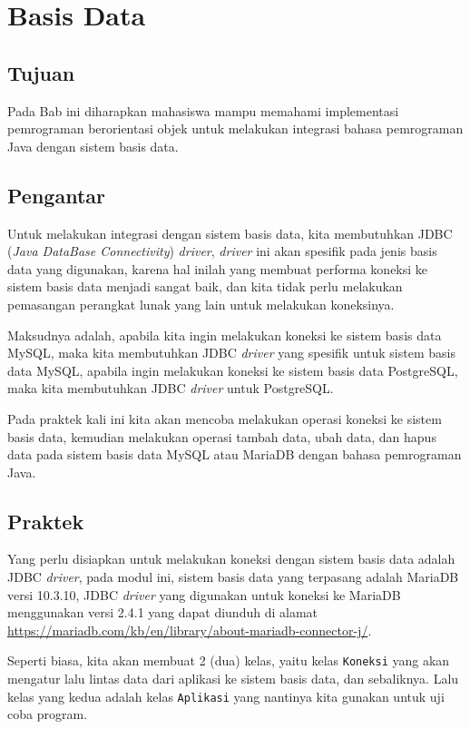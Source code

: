 \chapter{Basis Data}

\section{Tujuan}

Pada Bab ini diharapkan mahasiswa mampu memahami implementasi pemrograman berorientasi objek untuk melakukan integrasi bahasa pemrograman Java dengan sistem basis data.

\section{Pengantar}

Untuk melakukan integrasi dengan sistem basis data, kita membutuhkan JDBC (\textit{Java DataBase Connectivity}) \textit{driver}, \textit{driver} ini akan spesifik pada jenis basis data yang digunakan, karena hal inilah yang membuat performa koneksi ke sistem basis data menjadi sangat baik, dan kita tidak perlu melakukan pemasangan perangkat lunak yang lain untuk melakukan koneksinya.

Maksudnya adalah, apabila kita ingin melakukan koneksi ke sistem basis data MySQL, maka kita membutuhkan JDBC \textit{driver} yang spesifik untuk sistem basis data MySQL, apabila ingin melakukan koneksi ke sistem basis data PostgreSQL, maka kita membutuhkan JDBC \textit{driver} untuk PostgreSQL.

Pada praktek kali ini kita akan mencoba melakukan operasi koneksi ke sistem basis data, kemudian melakukan operasi tambah data, ubah data, dan hapus data pada sistem basis data MySQL atau MariaDB dengan bahasa pemrograman Java.

\section{Praktek}

Yang perlu disiapkan untuk melakukan koneksi dengan sistem basis data adalah JDBC \textit{driver}, pada modul ini, sistem basis data yang terpasang adalah MariaDB versi 10.3.10, JDBC \textit{driver} yang digunakan untuk koneksi ke MariaDB menggunakan versi 2.4.1 yang dapat diunduh di alamat \url{https://mariadb.com/kb/en/library/about-mariadb-connector-j/}.

Seperti biasa, kita akan membuat 2 (dua) kelas, yaitu kelas \texttt{Koneksi} yang akan mengatur lalu lintas data dari aplikasi ke sistem basis data, dan sebaliknya. Lalu kelas yang kedua adalah kelas \texttt{Aplikasi} yang nantinya kita gunakan untuk uji coba program.

